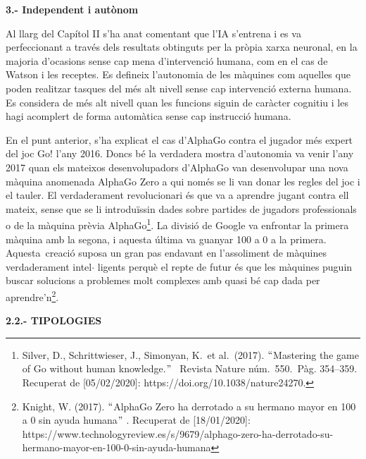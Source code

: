 \documentclass[12pt]{article}
\renewcommand{\_}{\kern-1.5pt\textunderscore\kern-1.5pt}
\begin{document}
\begin{itemize}
\vspace{\baselineskip}
\textbf{3.- Independent i autònom }\par


\vspace{\baselineskip}
\begin{justify}
Al llarg del Capítol II s’ha anat comentant que l’IA s’entrena i es va perfeccionant a través dels resultats obtinguts per la pròpia xarxa neuronal, en la majoria d’ocasions sense cap mena d’intervenció humana, com en el cas de Watson i les receptes. Es defineix l’autonomia de les màquines com aquelles que poden realitzar tasques del més alt nivell sense cap intervenció externa humana. Es considera de més alt nivell quan les funcions siguin de caràcter cognitiu i les hagi acomplert de forma automàtica sense cap instrucció humana.
\end{justify}\par


\vspace{\baselineskip}
\begin{justify}
En el punt anterior, s’ha explicat el cas d’AlphaGo contra el jugador més expert del joc Go! l’any 2016. Doncs bé la verdadera mostra d’autonomia va venir l’any 2017 quan els mateixos desenvolupadors d’AlphaGo van desenvolupar una nova màquina anomenada AlphaGo Zero a qui només se li van donar les regles del joc i el tauler. El verdaderament revolucionari és que va a aprendre jugant contra ell mateix, sense que se li introduïssin dades sobre partides de jugadors professionals o de la màquina prèvia AlphaGo\footnote{ Silver, D., Schrittwieser, J., Simonyan, K. et al. (2017). $``$Mastering the game of Go without human knowledge.$"$  Revista Nature núm. 550. Pàg. 354–359. Recuperat de [05/02/2020]: https://doi.org/10.1038/nature24270.  }. La divisió de Google va enfrontar la primera màquina amb la segona, i aquesta última va guanyar 100 a 0 a la primera.  Aquesta\ creació suposa un gran pas endavant  en l’assoliment de màquines verdaderament intel$ \cdot $ ligents perquè el repte de futur és que les màquines puguin buscar solucions a problemes molt complexes amb quasi bé cap dada per aprendre’n\footnote{ Knight, W. (2017). $``$AlphaGo Zero ha derrotado a su hermano mayor en 100 a 0 sin ayuda humana$"$ .  Recuperat de [18/01/2020]: https://www.technologyreview.es/s/9679/alphago-zero-ha-derrotado-su-hermano-mayor-en-100-0-sin-ayuda-humana }. 
\end{justify}\par


\vspace{\baselineskip}
\begin{justify}
\textbf{2.2.- TIPOLOGIES}
\end{justify}\par



\end{itemize}
\end{document}

